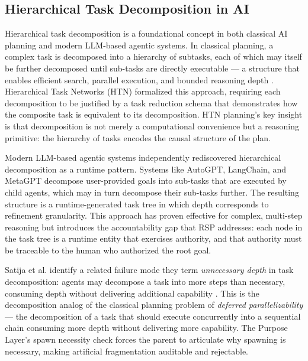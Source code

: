 \subsection{Hierarchical Task Decomposition in AI}

Hierarchical task decomposition is a foundational concept in both classical AI planning and modern LLM-based agentic systems. In classical planning, a complex task is decomposed into a hierarchy of subtasks, each of which may itself be further decomposed until sub-tasks are directly executable --- a structure that enables efficient search, parallel execution, and bounded reasoning depth \cite{planner2000}. Hierarchical Task Networks (HTN) formalized this approach, requiring each decomposition to be justified by a task reduction schema that demonstrates how the composite task is equivalent to its decomposition. HTN planning's key insight is that decomposition is not merely a computational convenience but a reasoning primitive: the hierarchy of tasks encodes the causal structure of the plan.

Modern LLM-based agentic systems independently rediscovered hierarchical decomposition as a runtime pattern. Systems like AutoGPT, LangChain, and MetaGPT decompose user-provided goals into sub-tasks that are executed by child agents, which may in turn decompose their sub-tasks further. The resulting structure is a runtime-generated task tree in which depth corresponds to refinement granularity. This approach has proven effective for complex, multi-step reasoning but introduces the accountability gap that RSP addresses: each node in the task tree is a runtime entity that exercises authority, and that authority must be traceable to the human who authorized the root goal.

Satija et al. identify a related failure mode they term \emph{unnecessary depth} in task decomposition: agents may decompose a task into more steps than necessary, consuming depth without delivering additional capability \cite{zhuge2024}. This is the decomposition analog of the classical planning problem of \emph{deferred parallelizability} --- the decomposition of a task that should execute concurrently into a sequential chain consuming more depth without delivering more capability. The Purpose Layer's spawn necessity check forces the parent to articulate why spawning is necessary, making artificial fragmentation auditable and rejectable.

